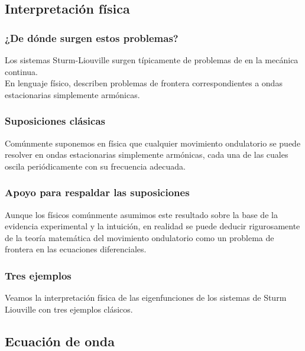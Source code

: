 \documentclass[12pt]{beamer}
\begin{document}
\subsection{Interpretación física}

\begin{frame}
\frametitle{¿De dónde surgen estos problemas?}
Los sistemas Sturm-Liouville surgen típicamente de problemas de  en la mecánica continua.
\\
\bigskip
\pause
En lenguaje físico, describen problemas de frontera correspondientes a ondas estacionarias simplemente armónicas.
\end{frame}
\begin{frame}
\frametitle{Suposiciones clásicas}
Comúnmente suponemos en física que cualquier movimiento ondulatorio se puede resolver en ondas estacionarias simplemente armónicas, cada una de las cuales oscila periódicamente con su frecuencia adecuada.
\end{frame}
\begin{frame}
\frametitle{Apoyo para respaldar las suposiciones}
Aunque los físicos comúnmente asumimos este resultado sobre la base de la evidencia experimental y la intuición, \pause en realidad se puede deducir rigurosamente de la teoría matemática del movimiento ondulatorio como un problema de frontera en las ecuaciones diferenciales.
\end{frame}
\begin{frame}
\frametitle{Tres ejemplos}
Veamos la interpretación física de las eigenfunciones de los sistemas de Sturm Liouville con tres ejemplos clásicos.
\end{frame}

\subsection{Ecuación de onda}
\end{document}
